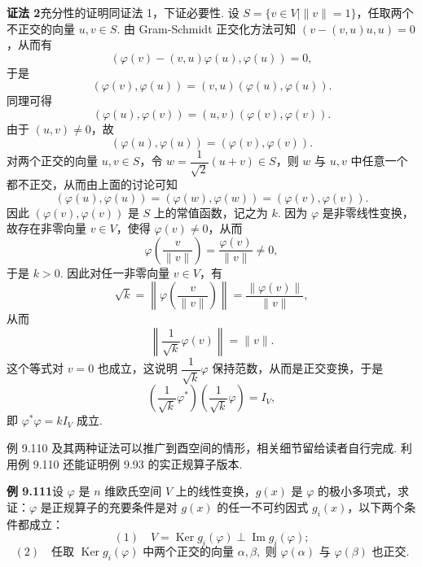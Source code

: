 \documentclass[UTF8,12pt,a4paper,fontset=fandol]{ctexart}
\begin{document}
\noindent\textbf{证法 2}\quad 充分性的证明同证法 1，下证必要性. 设 $S=\{v\in V\mid \|v\|=1\}$，任取两个不正交的向量 $u,v\in S$. 由 Gram-Schmidt 正交化方法可知 $(v-(v,u)u,u)=0$，从而有
\[
(\varphi(v)-(v,u)\varphi(u),\varphi(u))=0,
\]
于是
\[
(\varphi(v),\varphi(u))=(v,u)(\varphi(u),\varphi(u)).
\]
同理可得
\[
(\varphi(u),\varphi(v))=(u,v)(\varphi(v),\varphi(v)).
\]
由于 $(u,v)\ne0$，故
\[
(\varphi(u),\varphi(u))=(\varphi(v),\varphi(v)).
\]
对两个正交的向量 $u,v\in S$，令 $w=\dfrac{1}{\sqrt{2}}(u+v)\in S$，则 $w$ 与 $u,v$ 中任意一个都不正交，从而由上面的讨论可知
\[
(\varphi(u),\varphi(u))=(\varphi(w),\varphi(w))=(\varphi(v),\varphi(v)).
\]
因此 $(\varphi(v),\varphi(v))$ 是 $S$ 上的常值函数，记之为 $k$. 因为 $\varphi$ 是非零线性变换，故存在非零向量 $v\in V$，使得 $\varphi(v)\ne0$，从而
\[
\varphi\left(\frac{v}{\|v\|}\right)=\frac{\varphi(v)}{\|v\|}\ne0,
\]
于是 $k>0$. 因此对任一非零向量 $v\in V$，有
\[
\sqrt{k}=\left\|\varphi\left(\frac{v}{\|v\|}\right)\right\|=\frac{\|\varphi(v)\|}{\|v\|},
\]
从而
\[
\left\|\frac{1}{\sqrt{k}}\varphi(v)\right\|=\|v\|.
\]
这个等式对 $v=0$ 也成立，这说明 $\dfrac{1}{\sqrt{k}}\varphi$ 保持范数，从而是正交变换，于是
\[
\left(\frac{1}{\sqrt{k}}\varphi^*\right)\left(\frac{1}{\sqrt{k}}\varphi\right)=I_V,
\]
即 $\varphi^*\varphi=kI_V$ 成立.

例 9.110 及其两种证法可以推广到酉空间的情形，相关细节留给读者自行完成. 利用例 9.110 还能证明例 9.93 的实正规算子版本.

\noindent\textbf{例 9.111}\quad 设 $\varphi$ 是 $n$ 维欧氏空间 $V$ 上的线性变换，$g(x)$ 是 $\varphi$ 的极小多项式，求证：$\varphi$ 是正规算子的充要条件是对 $g(x)$ 的任一不可约因式 $g_i(x)$，以下两个条件都成立：
\[
(1)\quad V=\operatorname{Ker} g_i(\varphi)\perp\operatorname{Im} g_i(\varphi);
\]
\[
(2)\quad \text{任取 }\operatorname{Ker} g_i(\varphi)\text{ 中两个正交的向量 }\alpha,\beta,\text{ 则 }\varphi(\alpha)\text{ 与 }\varphi(\beta)\text{ 也正交.}
\]
\end{document}
